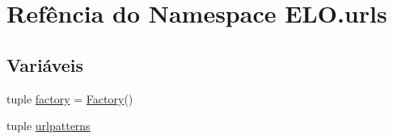 \hypertarget{namespaceELO_1_1urls}{\section{Refência do Namespace E\-L\-O.\-urls}
\label{namespaceELO_1_1urls}
}
\subsection*{Variáveis}
\begin{DoxyCompactItemize}
\item 
tuple \hyperlink{namespaceELO_1_1urls_a85325dfebd736ced5558533f2c4bc29a}{factory} = \hyperlink{classELO_1_1MainUnit_1_1Factory}{Factory}()
\item 
tuple \hyperlink{namespaceELO_1_1urls_a3451f093ed6ab05c006fd0d1cdba836d}{urlpatterns}
\end{DoxyCompactItemize}



